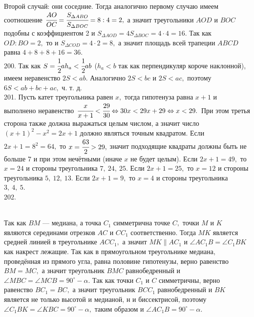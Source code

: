 \documentclass[12pt]{article}
\begin{document}
Второй случай: они соседние. Тогда аналогично первому случаю имеем соотношение $\cfrac{AO}{OC}=\cfrac{S_{\Delta ABO}}{S_{\Delta BOC}}=8:4=2,$ а значит треугольники $AOD$ и $BOC$ подобны с коэффициентом 2 и $S_{\Delta AOD}=4S_{\Delta BOC}=4\cdot4=16.$ Так как $OD:BO=2,$ то и $S_{\Delta COD}=4\cdot2=8,$ а значит площадь всей трапеции $ABCD$ равна $4+8+8+16=36.$\\
200. Так как $S=\cfrac{1}{2}a h_a<\cfrac{1}{2}ab$ ($h_a<b$ так как перпендикуляр короче наклонной), имеем неравенство $2S<ab.$ Аналогично $2S<bc$ и $2S<ac,$ поэтому $6S<ab+bc+ac,$ ч. т. д.\\
201. Пусть катет треугольника равен $x,$ тогда гипотенуза равна $x+1$ и выполнено неравенство $\cfrac{x}{x+1}<\cfrac{29}{30}\Leftrightarrow 30x<29x+29
\Leftrightarrow x<29.$ При этом третья сторона также должна выражаться целым числом, а значит число $(x+1)^2-x^2=2x+1$ должно являться точным квадратом.
Если $2x+1=8^2=64,$ то $x=\cfrac{63}{2}>29,$ значит подходящие квадраты должны быть не больше 7 и при этом нечётными (иначе $x$ не будет целым). Если $2x+1=49,$ то $x=24$ и стороны треугольника $7,\ 24,\ 25.$ Если $2x+1=25,$ то $x=12$ и стороны треугольника $5,\ 12,\ 13.$ Если $2x+1=9,$ то $x=4$ и стороны треугольника $3,\ 4,\ 5.$\\
202. \begin{figure}[ht!]
\end{figure}\\
Так как $BM$ --- медиана, а точка $C_1$ симметрична точке $C,$ точки $M$ и $K$ являются серединами отрезков $AC$ и $CC_1$ соответственно. Тогда $MK$ является средней линией в треугольнике $ACC_1,$ а значит $MK\parallel AC_1$ и $\angle AC_1B=\angle C_1BK$ как накрест лежащие. Так как в прямоугольном треугольнике медиана, проведённая из прямого угла, равна половине гипотенузы, верно равенство $BM=MC,$ а значит треугольник $BMC$ равнобедренный и $\angle MBC=\angle MCB=90^\circ-\alpha.$ Так как точки $C_1$ и $C$ симметричны, верно равенство $BC_1=BC,$ а значит треугольник $BCC_1$ равнобедренный и $BK$ является не только высотой и медианой, н и биссектрисой, поэтому $\angle C_1BK=\angle KBC=90^\circ-\alpha,$ таким образом и $\angle AC_1B=90^\circ-\alpha.$\\
\end{document}
